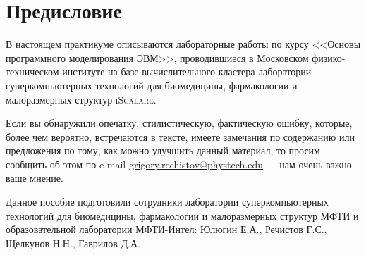\chapter*{Предисловие}\label{chap:contrib}

В настоящем практикуме описываются лабораторные работы по курсу <<Основы программного моделирования ЭВМ>>, проводившиеся в Московском физико-техническом институте на базе вычислительного кластера лаборатории суперкомпьютерных технологий для биомедицины, фармакологии и малоразмерных структур \textsc{iScalare}.

Если вы обнаружили опечатку, стилистическую, фактическую ошибку, которые, более чем вероятно, встречаются в тексте, имеете замечания по содержанию или предложения по тому, как можно улучшить данный материал, то просим сообщить об этом по e-mail \url{grigory.rechistov@phystech.edu} --- нам очень важно ваше мнение.

Данное пособие подготовили сотрудники лаборатории суперкомпьютерных технологий для биомедицины, фармакологии и малоразмерных структур МФТИ и образовательной лаборатории МФТИ-Интел: Юлюгин Е.А., Речистов Г.С., Щелкунов Н.Н., Гаврилов Д.А.